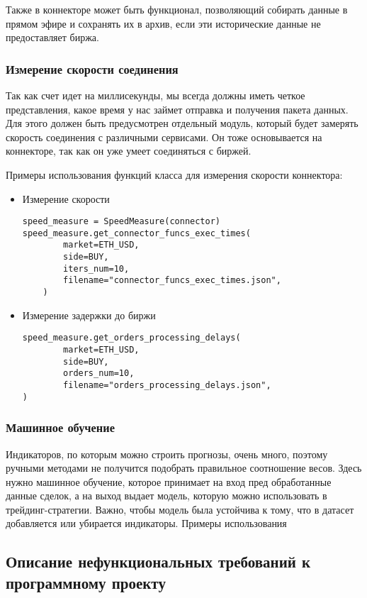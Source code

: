 Также в коннекторе может быть функционал, позволяющий собирать данные в прямом эфире и сохранять их в архив, если эти исторические данные не предоставляет биржа.

\subsubsection{Измерение скорости соединения}
Так как счет идет на миллисекунды, мы всегда должны иметь четкое представления, какое время у нас займет отправка и получения пакета данных. Для этого должен быть предусмотрен отдельный модуль, который будет замерять скорость соединения с различными сервисами. Он тоже основывается на коннекторе, так как он уже умеет соединяться с биржей.

Примеры использования функций класса для измерения скорости коннектора:
\begin{itemize}
\item Измерение скорости
\begin{verbatim}
speed_measure = SpeedMeasure(connector)
speed_measure.get_connector_funcs_exec_times(
        market=ETH_USD,
        side=BUY,
        iters_num=10,
        filename="connector_funcs_exec_times.json",
    )
\end{verbatim}

\item Измерение задержки до биржи
\begin{verbatim}
speed_measure.get_orders_processing_delays(
        market=ETH_USD,
        side=BUY,
        orders_num=10,
        filename="orders_processing_delays.json",
)
\end{verbatim}
\end{itemize}

\subsubsection{Машинное обучение}
Индикаторов, по которым можно строить прогнозы, очень много, поэтому ручными методами не получится подобрать правильное соотношение весов. Здесь нужно машинное обучение, которое принимает на вход пред обработанные данные сделок, а на выход выдает модель, которую можно использовать в трейдинг-стратегии. Важно, чтобы модель была устойчива к тому, что в датасет добавляется или убирается индикаторы.
Примеры использования

\subsection{Описание нефункциональных требований к программному проекту}

